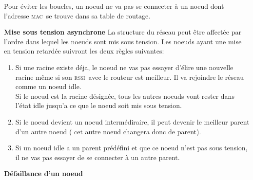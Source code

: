 \documentclass[a4paper, 12pt]{report}
\newcommand{\mac}{\textsc{mac}}
\newcommand{\rssi}{\textsc{rssi}}
\begin{document}
        Pour éviter les boucles, un noeud ne va pas se connecter à un noeud dont l'adresse \mac\ se trouve dans sa table de routage.
        \vspace{0.5cm}

        \textbf{Mise sous tension asynchrone}\newline
            La structure du réseau peut être affectée par l'ordre dans lequel les noeuds sont mis sous tension.
            Les noeuds ayant une mise en tension retardée suivront les deux règles suivantes:
            \begin{enumerate}
                \item Si une racine existe déja, le noeud ne vas pas essayer d'élire une nouvelle racine
                    même si son \rssi\ avec le routeur est meilleur. Il va rejoindre le réseau comme un noeud idle. \\
                    Si le noeud est la racine désignée, tous les autres noeuds vont rester dans l'état idle
                    jusqu'a ce que le noeud soit mis sous tension.
                \item Si le noeud devient un noeud intermédiraire, il peut devenir le meilleur parent d'un autre noeud ( cet autre noeud changera donc de parent).
                \item Si un noeud idle a un parent prédéfini et que ce noeud n'est pas sous tension, il ne vas pas essayer de se connecter à un autre parent.
            \end{enumerate}
        \vspace{0.5cm}
        \textbf{Défaillance d'un noeud}\newline
\end{document}
